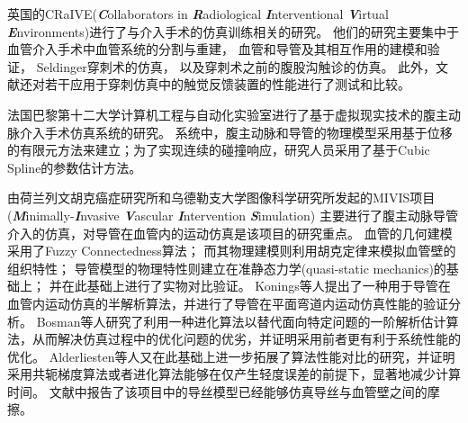 英国的CRaIVE(\textbf{\textit{C}}ollaborators in \textbf{\textit{R}}adiological \textbf{\textit{I}}nterventional \textbf{\textit{V}}irtual \textbf{\textit{E}}nvironments)\cite{CRaIVEweb}进行了与介入手术的仿真训练相关的研究。
他们的研究主要集中于血管介入手术中血管系统的分割与重建\cite{Luboz2008aCRaIVE}，
血管和导管及其相互作用的建模和验证\cite{Luboz2010CRaIVE}\cite{Luboz2009aCRaIVE}\cite{Luboz2008CRaIVE}，
Seldinger穿刺术的仿真\cite{luboz2009CRaIVE}\cite{John2008CRaIVE}，
以及穿刺术之前的腹股沟触诊的仿真\cite{Coles2011CRaIVE}\cite{Coles2009CRaIVE}。
此外，文献\cite{Coles2010CRaIVE}还对若干应用于穿刺仿真中的触觉反馈装置的性能进行了测试和比较。

法国巴黎第十二大学计算机工程与自动化实验室进行了基于虚拟现实技术的腹主动脉介入手术仿真系统的研究\cite{Ghembaza2004Paris12U}。
系统中，腹主动脉和导管的物理模型采用基于位移的有限元方法来建立；为了实现连续的碰撞响应，研究人员采用了基于Cubic Spline的参数估计方法。

由荷兰列文胡克癌症研究所和乌德勒支大学图像科学研究所发起的MIVIS项目(\textbf{\textit{M}}inimally-\textbf{\textit{I}}nvasive \textbf{\textit{V}}ascular \textbf{\textit{I}}ntervention \textbf{\textit{S}}imulation)\cite{alderliesten2002NKI}\cite{Konings2003NKI}\cite{alderliesten2004NKI}\cite{Bosman2005NKI}\cite{alderliesten2007NKI}\cite{alderliesten2007aNKI}
主要进行了腹主动脉导管介入的仿真，对导管在血管内的运动仿真是该项目的研究重点。
血管的几何建模采用了Fuzzy Connectedness算法\cite{Udupa1996NKI}\cite{alderliesten2002NKI}\cite{alderliesten2004NKI}；
而其物理建模则利用胡克定律来模拟血管壁的组织特性\cite{alderliesten2002NKI}\cite{alderliesten2004NKI}；
导管模型的物理特性则建立在准静态力学(quasi-static mechanics)的基础上\cite{alderliesten2002NKI}\cite{alderliesten2004NKI}；
并在此基础上进行了实物对比验证\cite{alderliesten2002NKI}\cite{alderliesten2004NKI}。
Konings等人\cite{Konings2003NKI}提出了一种用于导管在血管内运动仿真的半解析算法，并进行了导管在平面弯道内运动仿真性能的验证分析。
Bosman等人\cite{Bosman2005NKI}研究了利用一种进化算法以替代面向特定问题的一阶解析估计算法，从而解决仿真过程中的优化问题的优劣，并证明采用前者更有利于系统性能的优化。
Alderliesten等人\cite{alderliesten2007NKI}又在此基础上进一步拓展了算法性能对比的研究，并证明采用共轭梯度算法或者进化算法能够在仅产生轻度误差的前提下，显著地减少计算时间。
文献\cite{alderliesten2007aNKI}中报告了该项目中的导丝模型已经能够仿真导丝与血管壁之间的摩擦。

